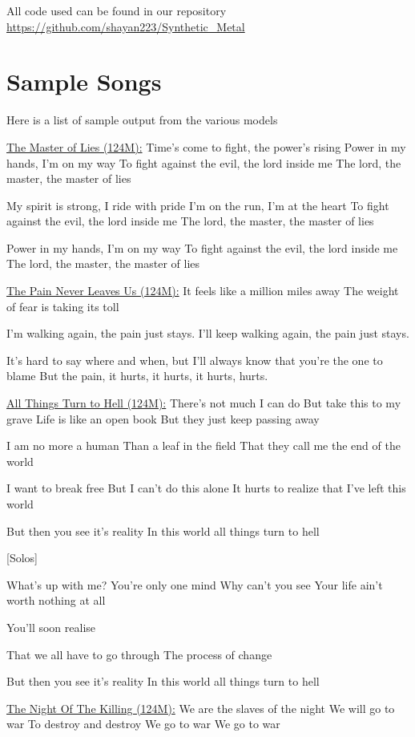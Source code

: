 \documentclass[11pt]{article}
\begin{document}
All code used can be found in our repository \href{https://github.com/shayan223/Synthetic_Metal}{https://github.com/shayan223/Synthetic\_Metal}


\section{Sample Songs}

Here is a list of sample output from the various models

\underline{The Master of Lies (124M):}
Time's come to fight, the power's rising
Power in my hands, I'm on my way
To fight against the evil, the lord inside me
The lord, the master, the master of lies

My spirit is strong, I ride with pride
I'm on the run, I'm at the heart
To fight against the evil, the lord inside me
The lord, the master, the master of lies

Power in my hands, I'm on my way
To fight against the evil, the lord inside me
The lord, the master, the master of lies

\underline{The Pain Never Leaves Us (124M):}
It feels like a million miles away
The weight of fear is taking its toll

I'm walking again, the pain just stays.
I'll keep walking again, the pain just stays.

It's hard to say where and when, but I'll always know that you're the one to blame
But the pain, it hurts, it hurts, it hurts, hurts.

\underline{All Things Turn to Hell (124M):}
There's not much I can do
But take this to my grave
Life is like an open book
But they just keep passing away

I am no more a human
Than a leaf in the field
That they call me the end of the world 

I want to break free
But I can't do this alone
It hurts to realize 
that I've left this world

But then you see it's reality
In this world all things turn to hell 

[Solos]

What's up with me? 
You're only one mind
Why can't you see
Your life ain't worth nothing at all

You'll soon realise

That we all have to go through
The process of change

But then you see it's reality
In this world all things turn to hell

\underline{The Night Of The Killing (124M):}
We are the slaves of the night
We will go to war
To destroy and destroy
We go to war
We go to war
\end{document}

